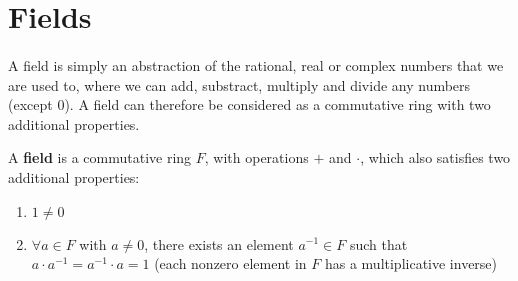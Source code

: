 \documentclass[../abstract_algebra.tex]{subfiles}
\begin{document}
    \section{Fields}
        \paragraph{}
        A field is simply an abstraction of the rational, real or complex numbers that we are used to, where we can add, substract, multiply and divide any numbers (except 0).
        A field can therefore be considered as a commutative ring with two additional properties.
        \begin{definition}
            A \textbf{field} is a commutative ring $F$, with operations $+$ and $\cdot$, which also satisfies two additional properties:
            \begin{enumerate}[label={\upshape(\roman*)}]
                \item $1\neq0$
                \item $\forall a\in F$ with $a\neq0$, there exists an element $a^{-1}\in F$ such that $a\cdot a^{-1}=a^{-1}\cdot a=1$ (each nonzero element in $F$ has a multiplicative inverse)
            \end{enumerate}
        \end{definition}
\end{document}
